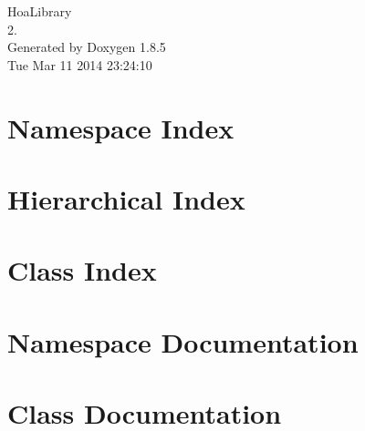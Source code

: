 \documentclass[twoside]{book}
\newcommand{\clearemptydoublepage}{%
  \newpage{\pagestyle{empty}\cleardoublepage}%
}
\begin{document}
\hypersetup{pageanchor=false}
\begin{titlepage}
\vspace*{7cm}
\begin{center}%
{\Large Hoa\-Library \\[1ex]\large 2. }\\
\vspace*{1cm}
{\large Generated by Doxygen 1.8.5}\\
\vspace*{0.5cm}
{\small Tue Mar 11 2014 23:24:10}\\
\end{center}
\end{titlepage}
\clearemptydoublepage
\tableofcontents
\clearemptydoublepage
{}
\hypersetup{pageanchor=true}

\chapter{Namespace Index}

\chapter{Hierarchical Index}

\chapter{Class Index}

\chapter{Namespace Documentation}



\chapter{Class Documentation}


































\newpage
{}
{}
\printindex
\end{document}
